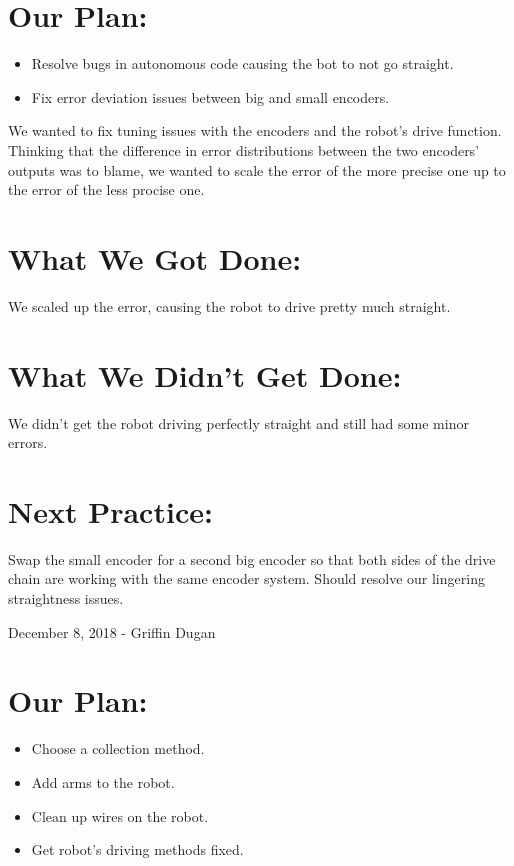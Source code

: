 \documentclass[12pt]{article}
\begin{document}
\section{Our Plan:}
\begin{itemize}
	\item Resolve bugs in autonomous code causing the bot to not go straight.
	\item Fix error deviation issues between big and small encoders.
\end{itemize}

We wanted to fix tuning issues with the encoders and the robot's drive function. Thinking that the difference in error distributions between the two encoders' outputs was to blame, we wanted to scale the error of the more precise one up to the error of the less procise one.

\section{What We Got Done:}

We scaled up the error, causing the robot to drive pretty much straight.

\section{What We Didn't Get Done:}

We didn't get the robot driving perfectly straight and still had some minor errors.

\section{Next Practice:}

Swap the small encoder for a second big encoder so that both sides of the drive chain are working with the same encoder system. Should resolve our lingering straightness issues.

\newpage
\setcounter{section}{0}

December 8, 2018 - Griffin Dugan

\section{Our Plan:} 
\begin{itemize}
	\item Choose a collection method.
	\item Add arms to the robot.
	\item Clean up wires on the robot.
	\item Get robot's driving methods fixed.
\end{itemize}
\end{document}
